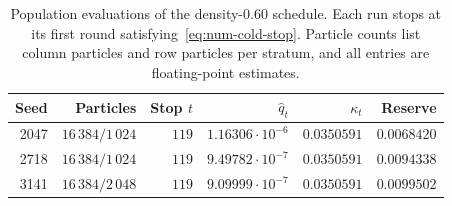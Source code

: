 \begin{table}[htbp]
\centering
\caption{Population evaluations of the density-$0.60$ schedule. Each run stops at its first round satisfying~\eqref{eq:num-cold-stop}. Particle counts list column particles and row particles per stratum, and all entries are floating-point estimates.}
\label{tab:num-060-stopping-replicas}
\begin{tabular}{rrrrrr}
\toprule
Seed & Particles & Stop $t$ & $\widehat q_t$ & $\kappa_t$ & Reserve\\
\midrule
2047 & $16\,384/1\,024$ & $119$ & $1.16306\cdot10^{-6}$ & $0.0350591$ & $0.0068420$\\
2718 & $16\,384/1\,024$ & $119$ & $9.49782\cdot10^{-7}$ & $0.0350591$ & $0.0094338$\\
3141 & $16\,384/2\,048$ & $119$ & $9.09999\cdot10^{-7}$ & $0.0350591$ & $0.0099502$\\
\bottomrule
\end{tabular}
\end{table}
